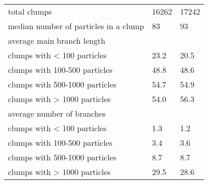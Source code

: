 \begin{table*}
{\begin{tabular}[c]{l | p{2.8cm} | p{2.8cm} |}
			\hline
			total clumps	 						&	 16262	& 	17242 	\\			
			median number of particles in a clump 	&	 83		& 	93 		\\			
			\hline
			average main branch length & & \\
			clumps with < 100 particles		&	23.2	& 	20.5 	\\			
			clumps with 100-500 particles	&	48.8	& 	48.6 	\\			
			clumps with 500-1000 particles	&	54.7	& 	54.9 	\\			
			clumps with > 1000 particles	&	54.0	& 	56.3 	\\			
			\hline
			average number of branches & & \\
			clumps with < 100 particles		&	1.3		& 	1.2 	\\			
			clumps with 100-500 particles	&	3.4		& 	3.6 	\\			
			clumps with 500-1000 particles	&	8.7		& 	8.7 	\\			
			clumps with > 1000 particles	&	29.5	& 	28.6 	\\				
			\hline	
		\end{tabular}
	}
\end{table*}
